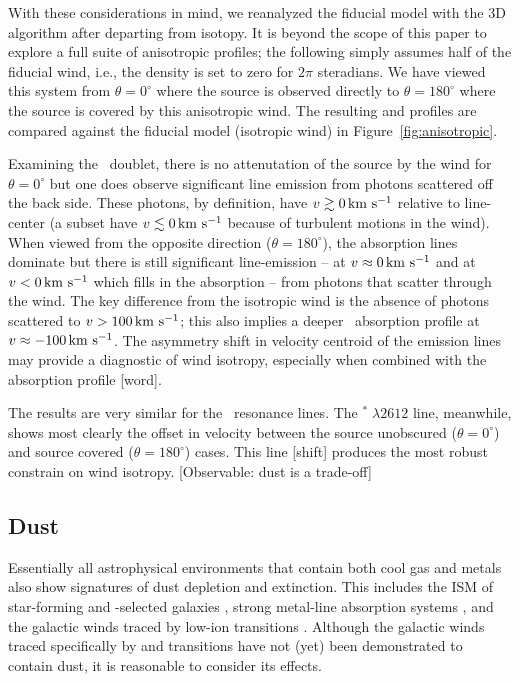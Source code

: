 \documentclass[12pt,preprint]{aastex}
\begin{document}
With these considerations in mind, we reanalyzed the fiducial model
with the 3D algorithm after departing from isotopy.  It is beyond the
scope of this paper to explore a full suite of anisotropic profiles;
the following simply assumes half of the fiducial wind, i.e.,  
the density is set to zero for $2\pi$ steradians.
We have viewed this system from $\theta = 0^\circ$ where
the source is observed directly to $\theta = 180^\circ$ where the source
is covered by this anisotropic wind.  The resulting  and
 profiles are compared against the fiducial model
(isotropic wind) in Figure~\ref{fig:anisotropic}.  

Examining the \mgiid\ doublet, 
there is no attenutation of the source by the wind for $\theta =
0^\circ$
but one does observe significant line emission from photons scattered
off the back side.  These photons, by definition, have $v \gtrsim 0 \, {\rm km~s^{-1}}$
relative to line-center (a subset have $v \lesssim 0 \, {\rm km~s^{-1}}$ because
of turbulent motions in the wind). 
When viewed from the opposite direction ($\theta = 180^\circ$), the
absorption lines dominate but there is still significant
line-emission -- at $v \approx 0 \, {\rm km~s^{-1}}$ and at $v < 0 \, {\rm km~s^{-1}}$ which fills
in the absorption -- from photons that scatter through the wind.  The
key difference from the isotropic wind is the absence of photons
scattered to $v > 100 \, {\rm km~s^{-1}}$;  this also implies a deeper 
\mgiib\ absorption profile at $v \approx -100 \, {\rm km~s^{-1}}$. The asymmetry
shift in velocity centroid of the emission lines
may provide a diagnostic of wind isotropy, especially when combined
with the absorption profile [word].

The results are very similar for the \feiid\ resonance lines.  The
$^* \; \lambda 2612$ line, meanwhile, shows most clearly the
offset in velocity between the source unobscured ($\theta = 0^\circ$)
and source covered ($\theta = 180^\circ$) cases.  This line [shift]
produces the most robust constrain on wind isotropy. [Observable: dust
is a trade-off]

\subsection{Dust}
\label{sec:dust}

Essentially all astrophysical environments that contain both cool gas
and metals also show signatures of dust depletion and extinction.  This includes the
ISM of star-forming and -selected galaxies
\citep[e.g.][]{ss96,pw01,pcd+07}, strong  metal-line
absorption systems \citep{ykv+06,mnt+08}, and the galactic winds traced
by low-ion transitions \citep{prs+02,rvs05b}.  Although the galactic winds
traced specifically by  and  transitions have not (yet) been
demonstrated to contain dust, it is reasonable to consider its
effects.
\end{document}
